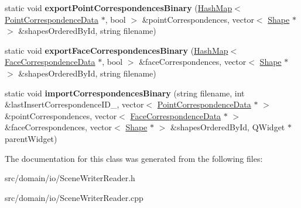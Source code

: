 \begin{DoxyCompactItemize}
\item 
\hypertarget{class_scene_writer_reader_a26a4d2d7b9c940cf41d634a3938357f3}{}static void {\bfseries export\+Point\+Correspondences\+Binary} (\hyperlink{class_hash_map}{Hash\+Map}$<$ \hyperlink{class_point_correspondence_data}{Point\+Correspondence\+Data} $\ast$, bool $>$ \&point\+Correspondences, vector$<$ \hyperlink{class_shape}{Shape} $\ast$ $>$ \&shapes\+Ordered\+By\+Id, string filename)\label{class_scene_writer_reader_a26a4d2d7b9c940cf41d634a3938357f3}

\item 
\hypertarget{class_scene_writer_reader_acb61e5abf970c27188f4c3a403cb9c49}{}static void {\bfseries export\+Face\+Correspondences\+Binary} (\hyperlink{class_hash_map}{Hash\+Map}$<$ \hyperlink{class_face_correspondence_data}{Face\+Correspondence\+Data} $\ast$, bool $>$ \&face\+Correspondences, vector$<$ \hyperlink{class_shape}{Shape} $\ast$ $>$ \&shapes\+Ordered\+By\+Id, string filename)\label{class_scene_writer_reader_acb61e5abf970c27188f4c3a403cb9c49}

\item 
\hypertarget{class_scene_writer_reader_a79d7598a4a0c4280387d1e03f8128e46}{}static void {\bfseries import\+Correspondences\+Binary} (string filename, int \&last\+Insert\+Correspondence\+I\+D\+\_\+, vector$<$ \hyperlink{class_point_correspondence_data}{Point\+Correspondence\+Data} $\ast$ $>$ \&point\+Correspondences, vector$<$ \hyperlink{class_face_correspondence_data}{Face\+Correspondence\+Data} $\ast$ $>$ \&face\+Correspondences, vector$<$ \hyperlink{class_shape}{Shape} $\ast$ $>$ \&shapes\+Ordered\+By\+Id, Q\+Widget $\ast$parent\+Widget)\label{class_scene_writer_reader_a79d7598a4a0c4280387d1e03f8128e46}

\end{DoxyCompactItemize}


The documentation for this class was generated from the following files\+:\begin{DoxyCompactItemize}
\item 
src/domain/io/Scene\+Writer\+Reader.\+h\item 
src/domain/io/Scene\+Writer\+Reader.\+cpp\end{DoxyCompactItemize}
